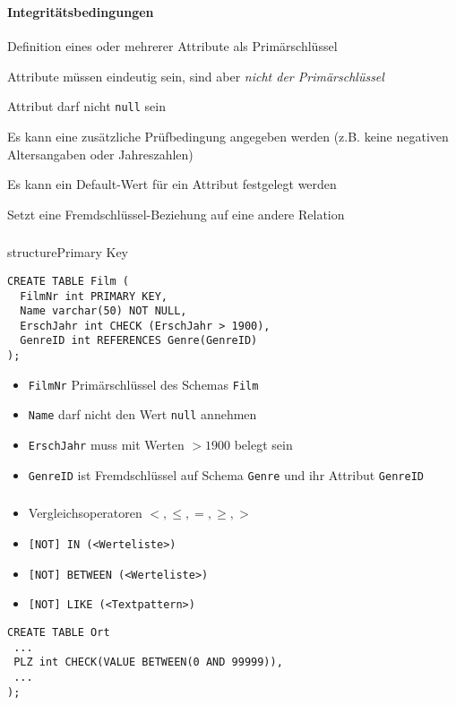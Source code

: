 \begin{frame}[fragile]\frametitle{\insertsection}
	\framesubtitle{\insertsubsection}
	\framesubtitle{Integritätsbedingungen}
	\abs
	\begin{description}[style=multiline,leftmargin=0cm]
		\item[PRIMARY KEY] Definition eines oder mehrerer Attribute als Primärschlüssel
		\item[UNIQUE] Attribute m\"ussen eindeutig sein, sind aber \textit{nicht der Primärschlüssel}
		\item[NOT NULL] Attribut darf nicht \texttt{null} sein
		\item[CHECK] Es kann eine zusätzliche Prüfbedingung angegeben werden (z.B. keine negativen Altersangaben oder Jahreszahlen)
		\item[DEFAULT] Es kann ein Default-Wert für ein Attribut festgelegt werden
		\item[REFERENCES] Setzt eine Fremdschlüssel-Beziehung auf eine andere Relation
	\end{description}
\end{frame}

\begin{frame}[fragile]
\frametitle{\insertsection}
\framesubtitle{\insertsubsection}
structure{Primary Key}
\begin{lstlisting}[xleftmargin=3ex]
CREATE TABLE Film (
  FilmNr int PRIMARY KEY,
  Name varchar(50) NOT NULL,
  ErschJahr int CHECK (ErschJahr > 1900),
  GenreID int REFERENCES Genre(GenreID)
);
		\end{lstlisting}
		\abs
\begin{itemize}
	\item \texttt{FilmNr} Primärschlüssel des Schemas \texttt{Film}
	\item \texttt{Name} darf nicht den Wert \texttt{null} annehmen 
	\item \texttt{ErschJahr} muss mit Werten $> 1900$ belegt sein
	\item \texttt{GenreID} ist Fremdschlüssel auf Schema \texttt{Genre} und ihr Attribut \texttt{GenreID}	
\end{itemize}
\end{frame}

\begin{frame}[fragile]\frametitle{\insertsection}
\framesubtitle{\insertsubsection}
\begin{itemize}
	\item Vergleichsoperatoren $<,\leq,=,\geq,>$
	\item \texttt{[NOT] IN (<Werteliste>)}
	\item \texttt{[NOT] BETWEEN (<Werteliste>)}
	\item \texttt{[NOT] LIKE (<Textpattern>)}
\end{itemize}
\abs
{}
\begin{lstlisting}[xleftmargin=3ex]
CREATE TABLE Ort
 ...
 PLZ int CHECK(VALUE BETWEEN(0 AND 99999)),
 ...
);
\end{lstlisting}
\end{frame}

